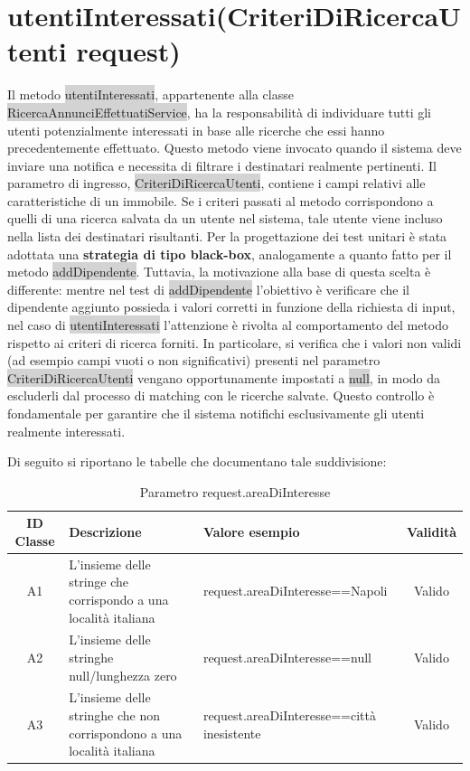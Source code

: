 \section{utentiInteressati(CriteriDiRicercaUtenti request)}

Il metodo \colorbox{lightgray}{utentiInteressati}, appartenente alla classe \colorbox{lightgray}{RicercaAnnunciEffettuatiService}, ha la responsabilità di individuare tutti gli utenti potenzialmente interessati in base alle ricerche che essi hanno precedentemente effettuato.
Questo metodo viene invocato quando il sistema deve inviare una notifica e necessita di filtrare i destinatari realmente pertinenti. Il parametro di ingresso, \colorbox{lightgray}{CriteriDiRicercaUtenti}, contiene i campi relativi alle caratteristiche di un immobile. Se i criteri passati al metodo corrispondono a quelli di una ricerca salvata da un utente nel sistema, tale utente viene incluso nella lista dei destinatari risultanti.
\newline
Per la progettazione dei test unitari è stata adottata una \textbf{strategia di tipo black-box}, analogamente a quanto fatto per il metodo \colorbox{lightgray} {addDipendente}. Tuttavia, la motivazione alla base di questa scelta è differente: mentre nel test di \colorbox{lightgray}{addDipendente} l’obiettivo è verificare che il dipendente aggiunto possieda i valori corretti in funzione della richiesta di input, nel caso di \colorbox{lightgray}{utentiInteressati} l’attenzione è rivolta al comportamento del metodo rispetto ai criteri di ricerca forniti.
In particolare, si verifica che i valori non validi (ad esempio campi vuoti o non significativi) presenti nel parametro \colorbox{lightgray}{CriteriDiRicercaUtenti} vengano opportunamente impostati a \colorbox{lightgray}{null}, in modo da escluderli dal processo di matching con le ricerche salvate. Questo controllo è fondamentale per garantire che il sistema notifichi esclusivamente gli utenti realmente interessati.

Di seguito si riportano le tabelle che documentano tale suddivisione:

\begin{table}[H]
	\centering
	\begin{tabular}{|c|p{4cm}|p{6cm}|c|} 
		\hline
		\textbf{ID Classe} & \textbf{Descrizione} & \textbf{Valore esempio} & \textbf{Validità} \\
		\hline
		A1 & L'insieme delle stringe che corrispondo a una località italiana
		& request.areaDiInteresse==Napoli & Valido \\
		\hline
		A2 & L'insieme delle stringhe null/lunghezza zero
		& request.areaDiInteresse==null & Valido \\
		\hline
		A3 & L'insieme delle stringhe che non corrispondono a una località italiana
		& request.areaDiInteresse==città inesistente & Valido \\
		\hline
	\end{tabular}
	\caption{Parametro request.areaDiInteresse}
	\label{tab:placeholder}
\end{table}

